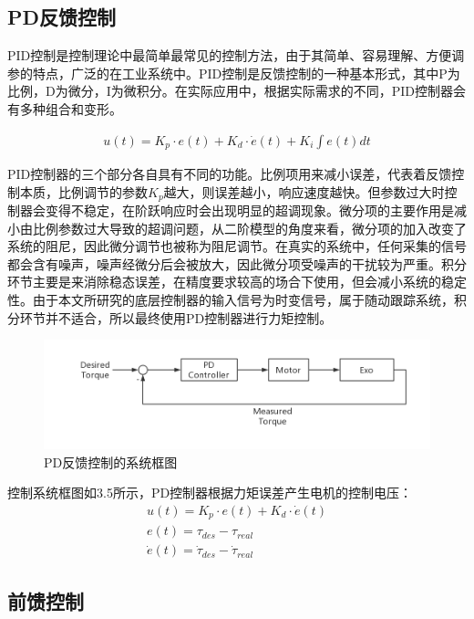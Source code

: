 \subsection{PD反馈控制}
PID控制是控制理论中最简单最常见的控制方法，由于其简单、容易理解、方便调参的特点，广泛的在工业系统中。PID控制是反馈控制的一种基本形式，其中P为比例，D为微分，I为微积分。在实际应用中，根据实际需求的不同，PID控制器会有多种组合和变形。

\begin{align}
    u(t) = K_p \cdot e(t) + K_d \cdot \dot{e}(t) + K_i\int e(t) dt
\end{align}

PID控制器的三个部分各自具有不同的功能。比例项用来减小误差，代表着反馈控制本质，比例调节的参数$K_p$越大，则误差越小，响应速度越快。但参数过大时控制器会变得不稳定，在阶跃响应时会出现明显的超调现象。微分项的主要作用是减小由比例参数过大导致的超调问题，从二阶模型的角度来看，微分项的加入改变了系统的阻尼，因此微分调节也被称为阻尼调节。在真实的系统中，任何采集的信号都会含有噪声，噪声经微分后会被放大，因此微分项受噪声的干扰较为严重。积分环节主要是来消除稳态误差，在精度要求较高的场合下使用，但会减小系统的稳定性。由于本文所研究的底层控制器的输入信号为时变信号，属于随动跟踪系统，积分环节并不适合，所以最终使用PD控制器进行力矩控制。

\begin{figure}[htb]
    \includegraphics[width=15cm]{fig/f54.jpg}
    \caption{PD反馈控制的系统框图}
    \label{fig:mark}
\end{figure}

控制系统框图如3.5所示，PD控制器根据力矩误差产生电机的控制电压：
\begin{align}
    u(t) = K_p \cdot e(t) + K_d \cdot \dot{e}(t) \\
    e(t) = \tau_{des} - \tau_{real} \\
    \dot e(t) = \dot\tau_{des} - \dot \tau_{real}
\end{align}

\subsection{前馈控制}


